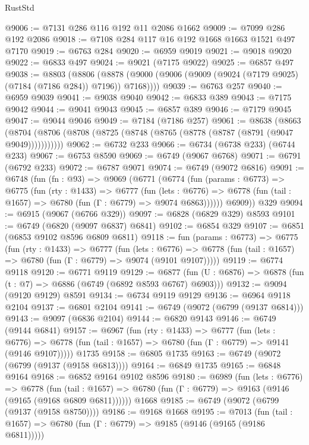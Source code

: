 \begin{lexlean}{RustStd}
\begin{coremodule}
@9006 := @7131 @286 @116 @192 @11 @2086 @1662
@9009 := @7099 @286 @192 @2086
@9018 := @7108 @284 @117 @16 @192 @1668 @1663 @1521 @497 @7170
@9019 := @6763 @284
@9020 := @6959 @9019
@9021 := @9018 @9020
@9022 := @6833 @497
@9024 := @9021 (@7175 @9022)
@9025 := @6857 @497
@9038 := @8803
    (@8806 (@8878 (@9000 (@9006 (@9009 (@9024 (@7179 @9025) (@7184 (@7186 @284)) @7196)) @7168))))
@9039 := @6763 @257
@9040 := @6959 @9039
@9041 := @9038 @9040
@9042 := @6833 @389
@9043 := @7175 @9042
@9044 := @9041 @9043
@9045 := @6857 @389
@9046 := @7179 @9045
@9047 := @9044 @9046
@9049 := @7184 (@7186 @257)
@9061 := @8638
    (@8663 (@8704 (@8706 (@8708 (@8725 (@8748 (@8765 (@8778 (@8787 (@8791 (@9047 @9049)))))))))))
@9062 := @6732 @233
@9066 := @6734 (@6738 @233) (@6744 @233)
@9067 := @6753 @8590
@9069 := @6749 (@9067 @6768)
@9071 := @6791 (@6792 @233)
@9072 := @6787 @9071
@9074 := @6749 (@9072 @6816)
@9091 := @6748
    (fun (fn : @93) =>
    @9069
      (@6771
        (@6774
          (fun (params : @6773) =>
          @6775
            (fun (rty : @1433) =>
            @6777
              (fun (lets : @6776) =>
              @6778 (fun (tail : @1657) => @6780 (fun (Γ : @6779) => @9074 @6863))))))
        @6909))
    @329
@9094 := @6915 (@9067 (@6766 @329))
@9097 := @6828 (@6829 @329) @8593
@9101 := @6749 (@6820 (@9097 @6837) @6841)
@9102 := @6854 @329
@9107 := @6851 (@6853 @9102 @8596 @6809 @6811)
@9118 := fun (params : @6773) =>
  @6775
    (fun (rty : @1433) =>
    @6777
      (fun (lets : @6776) =>
      @6778 (fun (tail : @1657) => @6780 (fun (Γ : @6779) => @9074 (@9101 @9107)))))
@9119 := @6774 @9118
@9120 := @6771 @9119
@9129 := @6877 (fun (U : @6876) => @6878 (fun (t : @7) => @6886 (@6749 (@6892 @8593 @6767) @6903)))
@9132 := @9094 (@9120 @9129) @8591
@9134 := @6734 @9119 @9129
@9136 := @6964 @9118 @2104
@9137 := @6801 @2104
@9141 := @6749 (@9072 (@6799 (@9137 @6814)))
@9143 := @9097 (@6836 @2104)
@9144 := @6820 @9143
@9146 := @6749 (@9144 @6841)
@9157 := @6967
    (fun (rty : @1433) =>
    @6777
      (fun (lets : @6776) =>
      @6778 (fun (tail : @1657) => @6780 (fun (Γ : @6779) => @9141 (@9146 @9107)))))
    @1735
@9158 := @6805 @1735
@9163 := @6749 (@9072 (@6799 (@9137 (@9158 @6813))))
@9164 := @6849 @1735
@9165 := @6848 @9164
@9168 := @6852 @9164 @9102 @8596
@9180 := @6989
    (fun (lets : @6776) =>
    @6778
      (fun (tail : @1657) => @6780 (fun (Γ : @6779) => @9163 (@9146 (@9165 (@9168 @6809 @6811))))))
    @1668
@9185 := @6749 (@9072 (@6799 (@9137 (@9158 @8750))))
@9186 := @9168 @1668
@9195 := @7013
    (fun (tail : @1657) => @6780 (fun (Γ : @6779) => @9185 (@9146 (@9165 (@9186 @6811)))))

\end{coremodule}
\end{lexlean}
